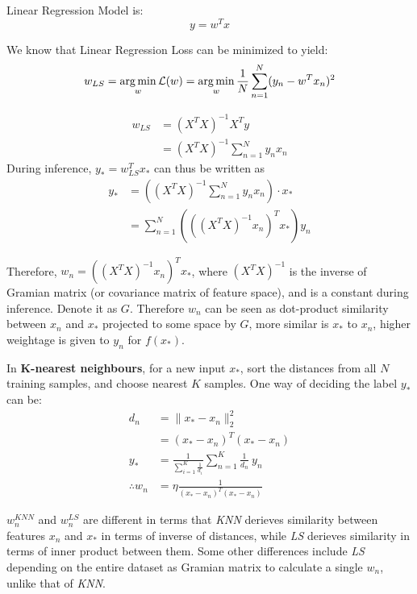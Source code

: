\documentclass[a4paper,11pt]{article}
\begin{document}
\begin{mlsolution}
    
Linear Regression Model is:
$$y = w^T x$$

We know that Linear Regression Loss can be minimized to yield:
$$w_{LS} = \mathop{\arg\min}_w \mathcal{L}(w) = \mathop{\arg\min}_w \frac{1}{N} \sum_{n=1}^{N} (y_n - w^T x_n)^2$$

\begin{align}
    w_{LS} &= (X^T X)^{-1} X^T y \\
           &= (X^T X)^{-1} \sum_{n=1}^{N} y_n x_n
\end{align}
During inference, $y_* = w^T_{LS} x_*$ can thus be written as
\begin{align*}
y_* &= ((X^T X)^{-1} \sum_{n=1}^{N} y_n x_n) \cdot x_* \\
    &= \sum_{n=1}^{N} \left(((X^T X)^{-1} x_n)^T x_*\right) y_n
\end{align*}

Therefore, $w_n = ((X^T X)^{-1} x_n)^T x_*$, where $(X^T X)^{-1}$ is the inverse of Gramian matrix (or covariance matrix of feature space), and is a constant during inference. Denote it as $G$. Therefore $w_n$ can be seen as dot-product similarity between $x_n$ and $x_*$ projected to some space by $G$, more similar is $x_*$ to $x_n$, higher weightage is given to $y_n$ for $f(x_*)$.

In \textbf{K-nearest neighbours}, for a new input $x_*$, sort the distances from all $N$ training samples, and choose nearest $K$ samples. One way of deciding the label $y_*$ can be:
\begin{align*}
d_n &= \lVert x_* - x_n \rVert _2^2 \\ 
    &= (x_* - x_n)^T(x_* - x_n) \\
y_* &= \frac{1}{\sum_{i=1}^{K} \frac{1}{d_i}} \sum_{n=1}^{K} \frac{1}{d_n}\ y_n \\
\therefore w_n &= \eta \frac{1}{(x_* - x_n)^T(x_* - x_n)}
\end{align*}

$w_n^\textit{KNN}$ and $w_n^\textit{LS}$ are different in terms that \textit{KNN} derieves similarity between features $x_n$ and $x_*$ in terms of inverse of distances, while \textit{LS} derieves similarity in terms of inner product between them. Some other differences include \textit{LS} depending on the entire dataset as Gramian matrix to calculate a single $w_n$, unlike that of \textit{KNN}.

\end{mlsolution}
\end{document}
